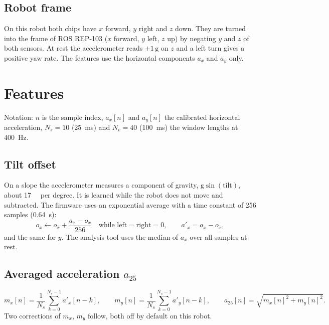\documentclass[11pt,a4paper]{article}
\newcommand{\g}{\,\mathrm{g}}
\newcommand{\gu}{\mathrm{g}}
\newcommand{\azf}{a_{25}}
\begin{document}
\subsection{Robot frame}

On this robot both chips have $x$ forward, $y$ right and $z$ down. They are turned into the frame
of ROS REP-103 ($x$ forward, $y$ left, $z$ up) by negating $y$ and $z$ of both sensors. At rest
the accelerometer reads $+1\g$ on $z$ and a left turn gives a positive yaw rate. The features use
the horizontal components $a_x$ and $a_y$ only.

\section{Features}

Notation: $n$ is the sample index, $a_x[n]$ and $a_y[n]$ the calibrated horizontal acceleration,
$N_s = 10$ (\SI{25}{\milli\second}) and $N_v = 40$ (\SI{100}{\milli\second}) the window lengths
at \SI{400}{\hertz}.

\subsection{Tilt offset}

On a slope the accelerometer measures a component of gravity, $\gu \sin(\text{tilt})$, about
\SI{17}{\milli\gu} per degree. It is learned while the robot does not move and subtracted. The
firmware uses an exponential average with a time constant of 256 samples (\SI{0.64}{\second}):
\begin{equation}
  o_x \leftarrow o_x + \frac{a_x - o_x}{256} \quad \text{while } \text{left} = \text{right} = 0,
  \qquad a'_x = a_x - o_x ,
\end{equation}
and the same for $y$. The analysis tool uses the median of $a_x$ over all samples at rest.

\subsection{Averaged acceleration $\azf$}

\begin{equation}
  m_x[n] = \frac{1}{N_s} \sum_{k=0}^{N_s-1} a'_x[n-k], \qquad
  m_y[n] = \frac{1}{N_s} \sum_{k=0}^{N_s-1} a'_y[n-k], \qquad
  \azf[n] = \sqrt{m_x[n]^2 + m_y[n]^2} .
\end{equation}
Two corrections of $m_x$, $m_y$ follow, both off by default on this robot.
\end{document}
